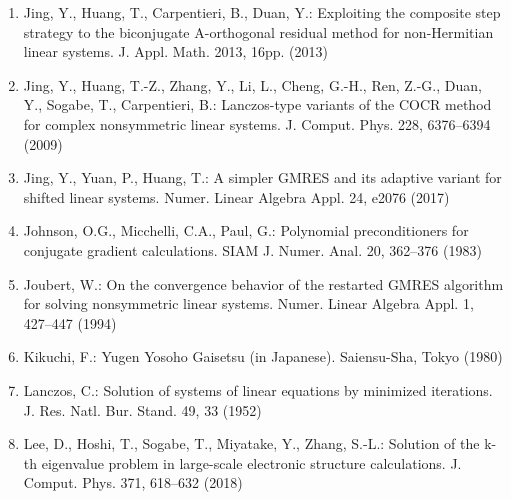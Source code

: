 \begin{enumerate}[label=\arabic*.,ref=\arabic*,leftmargin=3em]
\item\label{bib:source-113}Jing, Y., Huang, T., Carpentieri, B., Duan, Y.: Exploiting the composite step strategy to the biconjugate A-orthogonal residual method for non-Hermitian linear systems. J. Appl. Math. 2013, 16pp. (2013)

\item\label{bib:source-114}Jing, Y., Huang, T.-Z., Zhang, Y., Li, L., Cheng, G.-H., Ren, Z.-G., Duan, Y., Sogabe, T., Carpentieri, B.: Lanczos-type variants of the COCR method for complex nonsymmetric linear systems. J. Comput. Phys. 228, 6376–6394 (2009)

\item\label{bib:source-115}Jing, Y., Yuan, P., Huang, T.: A simpler GMRES and its adaptive variant for shifted linear systems. Numer. Linear Algebra Appl. 24, e2076 (2017)

\item\label{bib:source-116}Johnson, O.G., Micchelli, C.A., Paul, G.: Polynomial preconditioners for conjugate gradient calculations. SIAM J. Numer. Anal. 20, 362–376 (1983)

\item\label{bib:source-117}Joubert, W.: On the convergence behavior of the restarted GMRES algorithm for solving nonsymmetric linear systems. Numer. Linear Algebra Appl. 1, 427–447 (1994)

\item\label{bib:source-118}Kikuchi, F.: Yugen Yosoho Gaisetsu (in Japanese). Saiensu-Sha, Tokyo (1980)

\item\label{bib:source-119}Lanczos, C.: Solution of systems of linear equations by minimized iterations. J. Res. Natl. Bur. Stand. 49, 33 (1952)

\item\label{bib:source-120}Lee, D., Hoshi, T., Sogabe, T., Miyatake, Y., Zhang, S.-L.: Solution of the k-th eigenvalue problem in large-scale electronic structure calculations. J. Comput. Phys. 371, 618–632 (2018)


\end{enumerate}
